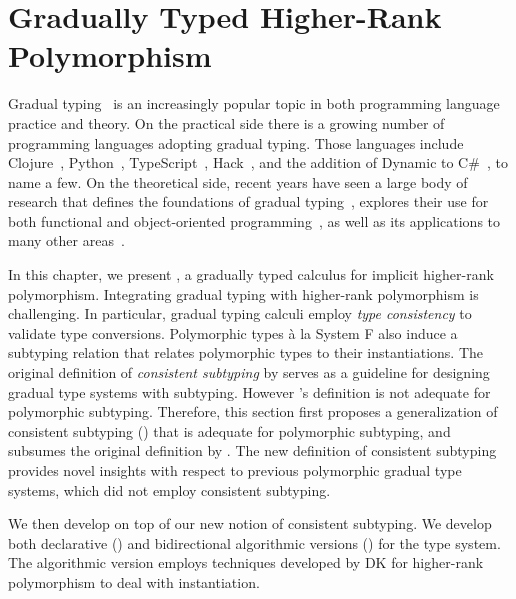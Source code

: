 \chapter{Gradually Typed Higher-Rank Polymorphism}
\label{chap:Gradual}

Gradual typing~\citep{siek2006gradual} is an increasingly popular topic in both
programming language practice and theory. On the practical side there is a
growing number of programming languages adopting gradual typing. Those languages
include Clojure~\citep{Bonnaire_Sergeant_2016}, Python~\citep{Vitousek_2014, lehtosalo2016mypy},
TypeScript~\citep{typescript}, Hack~\citep{verlaguet2013facebook}, and the
addition of Dynamic to C\#~\citep{Bierman_2010}, to name a few. On the
theoretical side, recent years have seen a large body of research that defines
the foundations of gradual typing~\citep{garcia:abstracting,
  cimini2016gradualizer, CiminiPOPL}, explores their use for both functional and
object-oriented programming~\citep{siek2006gradual, siek2007gradual}, as well as
its applications to many other areas~\citep{Ba_ados_Schwerter_2014,
  castagna2017gradual, Jafery:2017:SUR:3093333.3009865}.

In this chapter, we present \gpc, a gradually typed calculus for implicit
higher-rank polymorphism. Integrating gradual typing with higher-rank
polymorphism is challenging. In particular, gradual typing calculi employ
\textit{type consistency} to validate type conversions. Polymorphic types \`a la
System F also induce a subtyping relation that relates polymorphic types to
their instantiations. The original definition of \textit{consistent subtyping}
by \citet{siek2007gradual} serves as a guideline for designing gradual type
systems with subtyping. However \citeauthor{siek2007gradual}'s definition is not
adequate for polymorphic subtyping. Therefore, this section first proposes a
generalization of consistent subtyping () that is
adequate for polymorphic subtyping, and subsumes the original definition by
\citeauthor{siek2007gradual}. The new definition of consistent subtyping
provides novel insights with respect to previous polymorphic gradual type
systems, which did not employ consistent subtyping.

We then develop \gpc on top of our new notion of consistent subtyping. We
develop both declarative () and bidirectional
algorithmic versions () for the type system. The
algorithmic version employs techniques developed by DK \citep{DK} for
higher-rank polymorphism to deal with instantiation.








